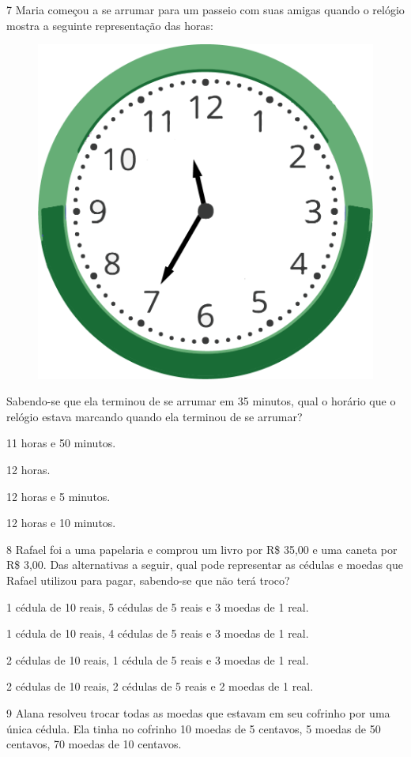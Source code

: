 \num{7} Maria começou a se arrumar para um passeio com suas amigas quando o relógio mostra a seguinte representação das horas:

\begin{figure}[htpb!]
\centering
\includegraphics[width=.5\textwidth]{./media/image116.png}
\end{figure}

\pagebreak
Sabendo-se que ela terminou de se arrumar em 35 minutos, qual o horário que o relógio estava marcando quando ela terminou de se arrumar?

\begin{escolha}
\item
  11 horas e 50 minutos.
\item
  12 horas.
\item
  12 horas e 5 minutos.
\item
  12 horas e 10 minutos.
\end{escolha}


\num{8} Rafael foi a uma papelaria e comprou um livro por R\$ 35,00 e uma caneta
por R\$ 3,00. Das alternativas a seguir, qual pode representar as cédulas
e moedas que Rafael utilizou para pagar, sabendo-se que não terá troco?

\begin{escolha}

\item
  1 cédula de 10 reais, 5 cédulas de 5 reais e 3 moedas de 1 real.
\item
  1 cédula de 10 reais, 4 cédulas de 5 reais e 3 moedas de 1 real.
\item
  2 cédulas de 10 reais, 1 cédula de 5 reais e 3 moedas de 1 real.
\item
  2 cédulas de 10 reais, 2 cédulas de 5 reais e 2 moedas de 1 real.
\end{escolha}


\num{9} Alana resolveu trocar todas as moedas que estavam em seu cofrinho por uma única cédula. Ela tinha no cofrinho 10 moedas de 5 centavos, 5 moedas de
50 centavos, 70 moedas de 10 centavos.

